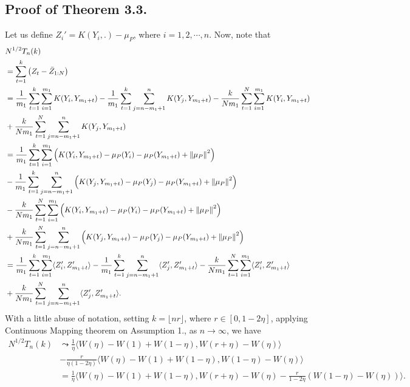 \documentclass[11pt]{article}
\theoremstyle{plain}
\theoremstyle{definition}
\theoremstyle{remark}
\begin{document}
\begin{appendix}
    \subsection{Proof of Theorem 3.3.}
    Let us define $Z_i'=K(Y_i,.)-\mu_P$, where $i=1,2,\cdots,n.$ Now, note that
\begin{align*}
    &N^{1/2}T_n(k)\\
    &= \sum_{t=1}^{k} \left(Z_t-\Bar{Z}_{1:N}\right)\\
    &=\frac{1}{m_1}\sum_{t=1}^{k}\sum_{i=1}^{m_1} K(Y_i, Y_{m_1+t})-\frac{1}{m_1}\sum_{t=1}^{k}\sum_{j=n-m_1+1}^{n} K(Y_j, Y_{m_1+t})-\frac{k}{N m_1}\sum_{t=1}^{N}\sum_{i=1}^{m_1} K(Y_i, Y_{m_1+t})\\
    &+\frac{k}{N m_1}\sum_{t=1}^{N}\sum_{j=n-m_1+1}^{n} K(Y_j, Y_{m_1+t})\allowdisplaybreaks\\
    &=\frac{1}{m_1}\sum_{t=1}^{k}\sum_{i=1}^{m_1} \left(K(Y_i, Y_{m_1+t})-\mu_P(Y_i)-\mu_P(Y_{m_1+t})+\left\|\mu_P\right\|^2\right)\\
    &-\frac{1}{m_1}\sum_{t=1}^{k}\sum_{j=n-m_1+1}^{n} \left(K(Y_j, Y_{m_1+t})-\mu_P(Y_j)-\mu_P(Y_{m_1+t})+\left\|\mu_P\right\|^2\right)\\
    &-\frac{k}{N m_1}\sum_{t=1}^{N}\sum_{i=1}^{m_1} \left(K(Y_i, Y_{m_1+t})-\mu_P(Y_i)-\mu_P(Y_{m_1+t})+\left\|\mu_P\right\|^2\right)\\
    &+\frac{k}{N m_1}\sum_{t=1}^{N}\sum_{j=n-m_1+1}^{n} \left(K(Y_j, Y_{m_1+t})-\mu_P(Y_j)-\mu_P(Y_{m_1+t})+\left\|\mu_P\right\|^2\right)\\
    &=\frac{1}{m_1}\sum_{t=1}^{k}\sum_{i=1}^{m_1} \langle Z'_i, Z'_{m_1+t} \rangle -\frac{1}{m_1}\sum_{t=1}^{k}\sum_{j=n-m_1+1}^{n} \langle Z'_j, Z'_{m_1+t}\rangle -\frac{k}{N m_1}\sum_{t=1}^{N}\sum_{i=1}^{m_1} \langle Z'_i, Z'_{m_1+t} \rangle\\
    &+ \frac{k}{N m_1}\sum_{t=1}^{N}\sum_{j=n-m_1+1}^{n} \langle Z'_j, Z'_{m_1+t}\rangle.
\end{align*}
With a little abuse of notation, setting $k=\lfloor nr \rfloor$, where $r \in [0,1-2\eta]$, applying Continuous Mapping theorem on Assumption 1., as $n \to \infty$, we have
\begin{align*}
    N^{1/2}T_n(k) &\leadsto \frac{1}{\eta} \langle W(\eta)-W(1)+W(1-\eta), W(r+\eta)-W(\eta) \rangle \\
    &-\frac{r}{\eta(1-2\eta)} \langle W(\eta)-W(1)+W(1-\eta), W(1-\eta)-W(\eta) \rangle\\
    &=\frac{1}{\eta} \langle W(\eta)-W(1)+W(1-\eta), W(r+\eta) -W(\eta) -\frac{r}{1-2\eta}(W(1-\eta)-W(\eta))\rangle.

\end{align*}
\end{appendix}
\end{document}
